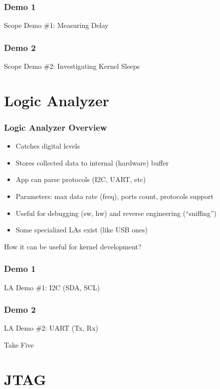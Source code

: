 \begin{frame}[standout]
  \frametitle{Demo 1}
  Scope Demo \#1: Measuring Delay
\end{frame}

\begin{frame}[standout]
  \frametitle{Demo 2}
  Scope Demo \#2: Investigating Kernel Sleeps
\end{frame}

\section{Logic Analyzer}

\begin{frame}
  \frametitle{Logic Analyzer Overview}
  \begin{itemize}
    \item Catches digital levels
    \item Stores collected data to internal (hardware) buffer
    \item App can parse protocols (I2C, UART, etc)
    \item Parameters: max data rate (freq), ports count, protocols support
    \item Useful for debugging (sw, hw) and reverse engineering (``sniffing'')
    \item Some specialized LAs exist (like USB ones)
  \end{itemize}
  How it can be useful for kernel development?
\end{frame}

\begin{frame}[standout]
  \frametitle{Demo 1}
  LA Demo \#1: I2C (SDA, SCL)
\end{frame}

\begin{frame}[standout]
  \frametitle{Demo 2}
  LA Demo \#2: UART (Tx, Rx)
\end{frame}

\begin{frame}[standout]
  Take Five
\end{frame}

\section{JTAG}

